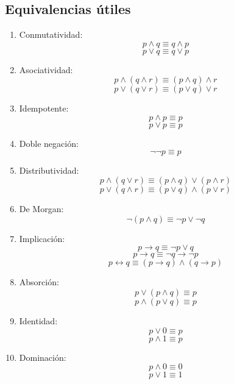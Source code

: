 \documentclass{article}
\begin{document}
\subsection{Equivalencias útiles}
\begin{enumerate}
    \item Conmutatividad: 
                        $$p \wedge q \equiv q \wedge p$$ 
                        $$p \vee q \equiv q \vee p$$
    \item Asociatividad: 
                        $$p \wedge (q \wedge r) \equiv (p \wedge q) \wedge r$$
                        $$p \vee (q \vee r) \equiv (p \vee q) \vee r$$
    \item Idempotente:
                        $$p \wedge p \equiv p$$
                        $$p \vee p \equiv p$$
    \item Doble negación:
                        $$\neg\neg p \equiv p$$
    \item Distributividad:
                        $$p \wedge (q \vee r) \equiv (p \wedge q) \vee (p \wedge r)$$
                        $$p \vee (q \wedge r) \equiv (p \vee q) \wedge (p \vee r)$$
    \item De Morgan:
                        $$\neg (p \wedge q) \equiv \neg p \vee \neg q$$
    \item Implicación:
                        $$p \rightarrow q \equiv \neg p \vee q$$
                        $$p \rightarrow q \equiv \neg q \rightarrow \neg p$$
                        $$p \leftrightarrow q \equiv (p \rightarrow q) \wedge (q \rightarrow p)$$
    \item Absorción:
                        $$p \vee (p \wedge q) \equiv p$$
                        $$p \wedge (p \vee q) \equiv p$$
    \item Identidad:
                        $$p \vee 0 \equiv p$$
                        $$p \wedge 1 \equiv p$$
    \item Dominación:
                        $$p \wedge 0 \equiv 0$$
                        $$p \vee 1 \equiv 1$$
\end{enumerate}
\end{document}
